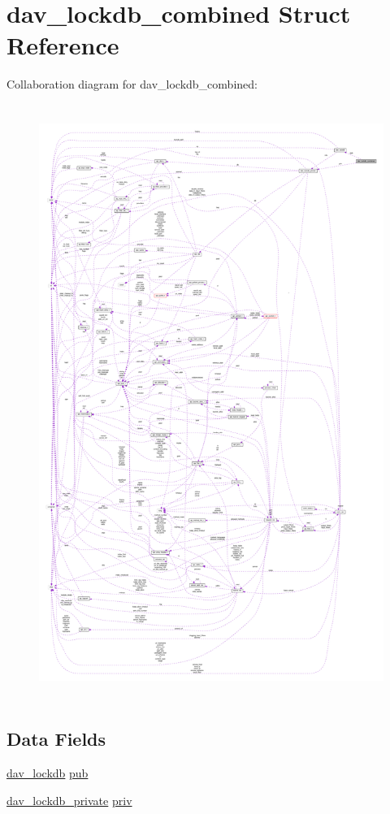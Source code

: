 \hypertarget{structdav__lockdb__combined}{}\section{dav\+\_\+lockdb\+\_\+combined Struct Reference}
\label{structdav__lockdb__combined}


Collaboration diagram for dav\+\_\+lockdb\+\_\+combined\+:
\nopagebreak
\begin{figure}[H]
\begin{center}
\leavevmode
\includegraphics[height=550pt]{structdav__lockdb__combined__coll__graph}
\end{center}
\end{figure}
\subsection*{Data Fields}
\begin{DoxyCompactItemize}
\item 
\hyperlink{structdav__lockdb}{dav\+\_\+lockdb} \hyperlink{structdav__lockdb__combined_a1e4c8ec31151ff74c6a66de9fca7f707}{pub}
\item 
\hyperlink{structdav__lockdb__private}{dav\+\_\+lockdb\+\_\+private} \hyperlink{structdav__lockdb__combined_a4ce88b1cbe795eff679a0903e14a6209}{priv}
\end{DoxyCompactItemize}


